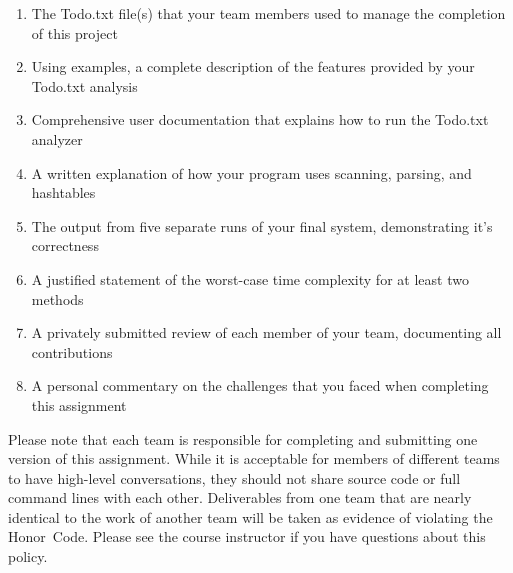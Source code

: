   \vspace*{-.05in}
 \begin{enumerate}
  \itemsep0pt

  \item The Todo.txt file(s) that your team members used to manage the completion of this project

  \item Using examples, a complete description of the features provided by your Todo.txt analysis

  \item Comprehensive user documentation that explains how to run the Todo.txt analyzer

  \item A written explanation of how your program uses scanning, parsing, and hashtables

  \item The output from five separate runs of your final system, demonstrating it's correctness

  \item A justified statement of the worst-case time complexity for at least two methods

  \item A privately submitted review of each member of your team, documenting all contributions

  \item A personal commentary on the challenges that you faced when completing this assignment

  \end{enumerate}
  \vspace*{-.05in}

  Please note that each team is responsible for completing and submitting one version of this assignment.  While it is
  acceptable for members of different teams to have high-level conversations, they should not share source code or full
  command lines with each other.  Deliverables from one team that are nearly identical to the work of another team will
  be taken as evidence of violating the \mbox{Honor Code}.  Please see the course instructor if you have questions about
  this policy.

  
